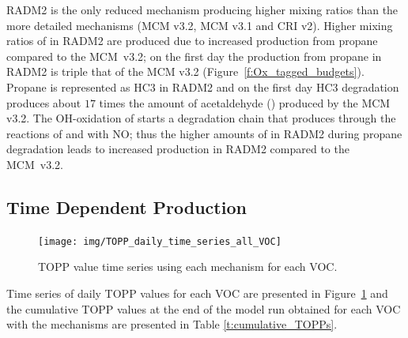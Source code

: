 RADM2 is the only reduced mechanism producing higher  mixing ratios than the more detailed mechanisms (MCM v3.2, MCM v3.1 and CRI v2).
Higher mixing ratios of  in RADM2 are produced due to increased  production from propane compared to the \mbox{MCM v3.2}; on the first day the  production from propane in RADM2 is triple that of the MCM v3.2 \mbox{(Figure \ref{f:Ox_tagged_budgets})}.
Propane is represented as HC3 in RADM2 \citep{Stockwell:1990} and on the first day HC3 degradation produces about $17$ times the amount of acetaldehyde () produced by the MCM v3.2.
The OH-oxidation of  starts a degradation chain that produces  through the reactions of  and  with NO; thus the higher amounts of  in RADM2 during propane degradation leads to increased  production in RADM2 compared to the \mbox{MCM v3.2}.
%
\subsection[Time Dependent Ox Production]{Time Dependent  Production}
%
\begin{figure}
    \centering
    \caption{TOPP value time series using each mechanism for each VOC.}
    \texttt{[image: img/TOPP\_daily\_time\_series\_all\_VOC]}
    \vspace{-2mm}
    \label{f:TOPP_dailies}
\end{figure}
%
Time series of daily TOPP values for each VOC are presented in \mbox{Figure \ref{f:TOPP_dailies}} and the cumulative TOPP values at the end of the model run obtained for each VOC with the mechanisms are presented in Table \ref{t:cumulative_TOPPs}.

